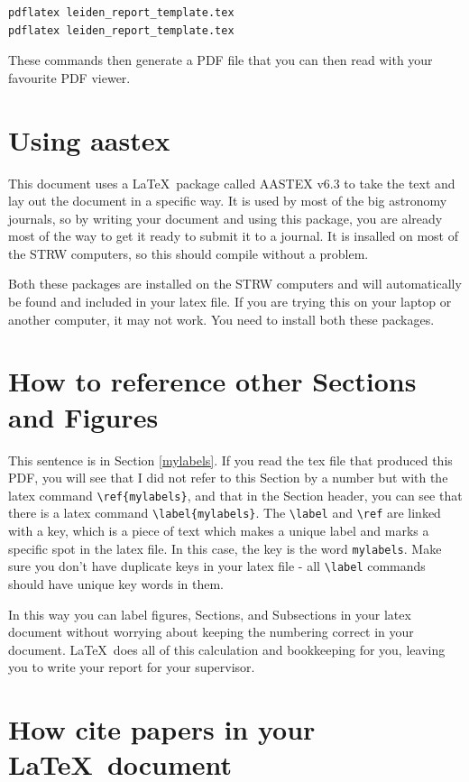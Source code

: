 \documentclass[a4,modern]{aastex63}
\begin{document}
\begin{verbatim}
pdflatex leiden_report_template.tex
pdflatex leiden_report_template.tex
\end{verbatim}

These commands then generate a PDF file that you can then read with your
favourite PDF viewer.

\section{Using aastex}


This document uses a \LaTeX\ package called AASTEX v6.3 to take the text and lay out the document in a specific way.
%
It is used by most of the big astronomy journals, so by writing your document and using this package, you are already most of the way to get it ready to submit it to a journal.
%
It is insalled on most of the STRW computers, so this should compile without a problem.


Both these packages are installed on the STRW computers and will automatically be found and included in your latex file.
%
If you are trying this on your laptop or another computer, it may not work.
%
You need to install both these packages.


\section{How to reference other Sections and Figures \label{mylabels}}

This sentence is in Section \ref{mylabels}.
%
If you read the tex file that produced this PDF, you will see that I did not refer to this Section by a number but with the latex command \verb=\ref{mylabels}=, and that in the Section header, you can see that there is a latex command \verb=\label{mylabels}=.
%
The \verb=\label= and \verb=\ref= are linked with a key, which is a piece of text which makes a unique label and marks a specific spot in the latex file.
%
In this case, the key is the word \verb=mylabels=.
%
Make sure you don't have duplicate keys in your latex file - all \verb=\label= commands should have unique key words in them.

In this way you can label figures, Sections, and Subsections in your latex document without worrying about keeping the numbering correct in your document.
%
\LaTeX\ does all of this calculation and bookkeeping for you, leaving you to write your report for your supervisor.

\section{How cite papers in your \LaTeX\ document}
\end{document}
